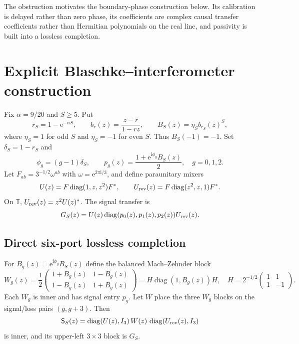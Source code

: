 \documentclass[11pt]{article}
\theoremstyle{definition}
\theoremstyle{remark}
\newcommand{\T}{\mathbb{T}}
\newcommand{\diag}{\operatorname{diag}}
\newcommand{\e}{\mathrm{e}}
\begin{document}
The obstruction motivates the boundary-phase construction below.  Its
calibration is delayed rather than zero phase, its coefficients are complex
causal transfer coefficients rather than Hermitian polynomials on the real
line, and passivity is built into a lossless completion.

\section{Explicit Blaschke--interferometer construction}

Fix $\alpha=9/20$ and $S\geq5$.  Put
\begin{equation}\label{eq:rdef}
 r_S=1-\e^{-\alpha S},\qquad
 b_r(z)=\frac{z-r}{1-rz},\qquad
 B_S(z)=\eta_S b_{r_S}(z)^S,
\end{equation}
where $\eta_S=1$ for odd $S$ and $\eta_S=-1$ for even $S$.  Thus
$B_S(-1)=-1$.  Set $\delta_S=1-r_S$ and
\begin{equation}\label{eq:pg}
 \phi_g=(g-1)\delta_S,\qquad
 p_g(z)=\frac{1+\e^{\mathrm{i}\phi_g}B_S(z)}{2},
 \quad g=0,1,2.
\end{equation}
Let $F_{ab}=3^{-1/2}\omega^{ab}$ with
$\omega=\e^{2\pi\mathrm{i}/3}$, and define paraunitary mixers
\begin{equation}\label{eq:mixers}
 U(z)=F\diag(1,z,z^2)F^*,\qquad
 U_{\rm rev}(z)=F\diag(z^2,z,1)F^*.
\end{equation}
On $\T$, $U_{\rm rev}(z)=z^2U(z)^*$.  The signal transfer is
\begin{equation}\label{eq:Gdef}
 G_S(z)=U(z)\diag(p_0(z),p_1(z),p_2(z))U_{\rm rev}(z).
\end{equation}

\subsection{Direct six-port lossless completion}

For $B_g(z)=\e^{\mathrm{i}\phi_g}B_S(z)$ define the balanced
Mach--Zehnder block
\begin{equation}\label{eq:MZI}
 W_g(z)=\frac12
 \begin{pmatrix}1+B_g(z)&1-B_g(z)\\1-B_g(z)&1+B_g(z)\end{pmatrix}
 =H\diag(1,B_g(z))H,
 \quad H=2^{-1/2}\begin{pmatrix}1&1\\1&-1\end{pmatrix}.
\end{equation}
Each $W_g$ is inner and has signal entry $p_g$.  Let $W$ place the three
$W_g$ blocks on the signal/loss pairs $(g,g+3)$.  Then
\begin{equation}\label{eq:sixport}
 \mathsf{S}_S(z)=
 \diag(U(z),I_3)\,W(z)\,\diag(U_{\rm rev}(z),I_3)
\end{equation}
is inner, and its upper-left $3\times3$ block is $G_S$.
\end{document}
